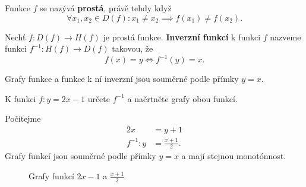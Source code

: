 \begin{definition}
  Funkce $f$ se nazývá \textbf{prostá}, právě tehdy když
  \[
    \forall x_1,x_2\in D(f): x_1\ne x_2 \implies f(x_1)\ne f(x_2).
  \]
\end{definition}

\begin{definition}
	Nechť $f:D(f)\to H(f)$ je prostá funkce. \textbf{Inverzní funkcí} k funkci $f$ nazveme funkci
	$f^{-1}:H(f)\to D(f)$ takovou, že
	$$
	    f(x)=y\iff f^{-1}(y)=x.
	$$
\end{definition}

\begin{pozn}
	   Grafy funkce a funkce k ní inverzní jsou souměrné podle přímky $y=x$.
\end{pozn}

\begin{priklad}
K funkci $f:y=2x-1$ určete $f^{-1}$ a načrtněte grafy obou funkcí.
\end{priklad}

\begin{reseni}
Počítejme
\begin{align*}
    2x&=y+1\\
    f^{-1}:y &= \frac{x+1}{2}.
\end{align*}
Grafy funkcí jsou souměrné podle přímky $y=x$ a mají stejnou monotónnost.

\begin{figure}[ht!]
  \centering
  \caption{Grafy funkcí $2x-1$ a $\frac{x+1}{2}$}
\end{figure}
\end{reseni}

